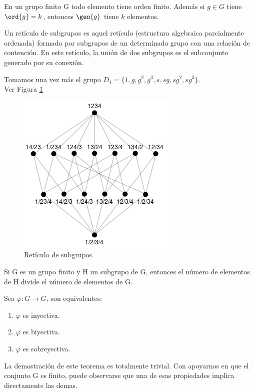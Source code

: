 \documentclass[nochap]{apuntes}
\begin{document}
  \begin{theorem}
   En un grupo finito G todo elemento tiene orden finito. Además si $g\in G$ tiene $\ord{g}=k$, entonces $\gen{g}$ tiene $k$ elementos.
  \end{theorem}

  \begin{defn}
   Un retículo de subgrupos es aquel retículo (estructura algebraica parcialmente ordenada) formado por subgrupos de un determinado grupo
   con una relación de contención. En este retículo, la unión de dos subgrupos es el subconjunto generado por su conexión.
  \end{defn}

  \begin{example}
   Tomamos una vez más el grupo $D_{4}=\{1,g,g^{2}, g^{3}, s, sg, sg^{2}, sg^{3}\}$.\\ Ver Figura \ref{Reticulo}\\
  \end{example}
  
   \begin{figure}[h]
   	\centering
	\includegraphics[scale=1]{Reticulo.jpg}   
	\caption{Retículo de subgrupos.}
	\label{Reticulo}
   \end{figure}

  \begin{theorem}
   Si G es un grupo finito y H un subgrupo de G, entonces el número de elementos de H divide el número de elementos de G.
  \end{theorem}
  
  \begin{lemma}
   Sea $\varphi: G\rightarrow G$, son equivalentes:
   \begin{enumerate}
    \item $\varphi$  es inyectiva.
    \item $\varphi$  es biyectiva.
    \item $\varphi$  es sobreyectiva.
   \end{enumerate}
  \end{lemma}
  La demostración de este teorema es totalmente trivial. Con apoyarnos en que el conjunto G es finito, puede observarse que una de
  esas propiedades implica directamente las demas.
  
\end{document}
